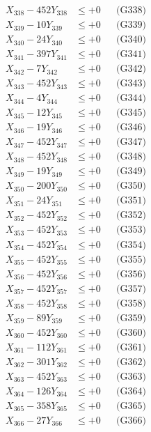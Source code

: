 \documentclass[a4paper,10pt]{article}
\begin{document}
{\begin{align}
X_{338} - 452Y_{338} &\leq +0 && \text{(G338)} \\
X_{339} - 10Y_{339} &\leq +0 && \text{(G339)} \\
X_{340} - 24Y_{340} &\leq +0 && \text{(G340)} \\
\allowbreak
X_{341} - 397Y_{341} &\leq +0 && \text{(G341)} \\
X_{342} - 7Y_{342} &\leq +0 && \text{(G342)} \\
X_{343} - 452Y_{343} &\leq +0 && \text{(G343)} \\
X_{344} - 4Y_{344} &\leq +0 && \text{(G344)} \\
X_{345} - 12Y_{345} &\leq +0 && \text{(G345)} \\
X_{346} - 19Y_{346} &\leq +0 && \text{(G346)} \\
X_{347} - 452Y_{347} &\leq +0 && \text{(G347)} \\
X_{348} - 452Y_{348} &\leq +0 && \text{(G348)} \\
X_{349} - 19Y_{349} &\leq +0 && \text{(G349)} \\
X_{350} - 200Y_{350} &\leq +0 && \text{(G350)} \\
\allowbreak
X_{351} - 24Y_{351} &\leq +0 && \text{(G351)} \\
X_{352} - 452Y_{352} &\leq +0 && \text{(G352)} \\
X_{353} - 452Y_{353} &\leq +0 && \text{(G353)} \\
X_{354} - 452Y_{354} &\leq +0 && \text{(G354)} \\
X_{355} - 452Y_{355} &\leq +0 && \text{(G355)} \\
X_{356} - 452Y_{356} &\leq +0 && \text{(G356)} \\
X_{357} - 452Y_{357} &\leq +0 && \text{(G357)} \\
X_{358} - 452Y_{358} &\leq +0 && \text{(G358)} \\
X_{359} - 89Y_{359} &\leq +0 && \text{(G359)} \\
X_{360} - 452Y_{360} &\leq +0 && \text{(G360)} \\
\allowbreak
X_{361} - 112Y_{361} &\leq +0 && \text{(G361)} \\
X_{362} - 301Y_{362} &\leq +0 && \text{(G362)} \\
X_{363} - 452Y_{363} &\leq +0 && \text{(G363)} \\
X_{364} - 126Y_{364} &\leq +0 && \text{(G364)} \\
X_{365} - 358Y_{365} &\leq +0 && \text{(G365)} \\
X_{366} - 27Y_{366} &\leq +0 && \text{(G366)} \\

\end{align}}
\end{document}
